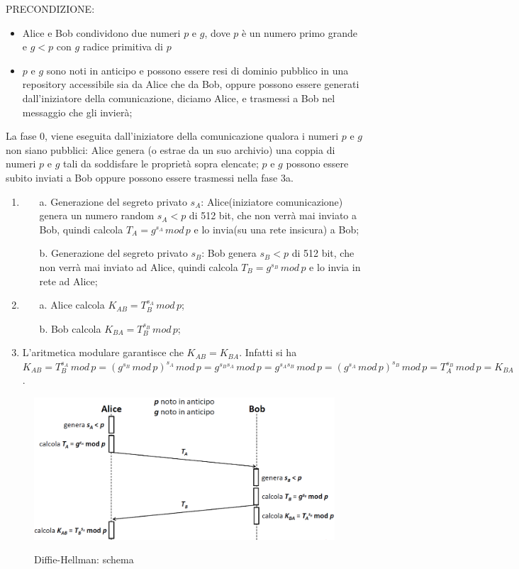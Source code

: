 PRECONDIZIONE: 
\begin{itemize}
\item Alice e Bob condividono due numeri $p$ e $g$, dove $p$ è un numero primo grande e $g<p$ con $g$ radice primitiva di $p$
\item $p$ e $g$ sono noti in anticipo e possono essere resi di dominio pubblico in una repository accessibile sia da Alice che da Bob, oppure possono essere generati dall'iniziatore della comunicazione,
diciamo Alice, e trasmessi a Bob nel messaggio che gli invierà;
\end{itemize}
La fase 0, viene eseguita dall'iniziatore della comunicazione qualora i numeri $p$ e $g$ non siano pubblici: Alice genera (o estrae da un suo archivio) una coppia di numeri $p$ e $g$ tali da soddisfare le proprietà sopra elencate; $p$ e $g$ possono essere subito inviati a Bob oppure possono essere trasmessi nella fase 3a.
\begin{enumerate}
\item \begin{enumerate}
\item [a.] Generazione del segreto privato $s_{A}$: Alice(iniziatore comunicazione) genera un numero random $s_{A}<p$ di 512 bit, che non verrà mai inviato a Bob, quindi calcola $T_{A}=g^{s_{A}} \, mod \,p$ e lo invia(su una rete insicura) a Bob;
\item [b.] Generazione del segreto privato $s_{B}$: Bob genera $s_{B}<p$ di 512 bit, che non verrà mai inviato ad Alice, quindi calcola $T_{B}=g^{s_{B}} \, mod \, p$ e lo invia in rete ad Alice;
\end{enumerate}
\item \begin{enumerate}
\item [a.] Alice calcola $K_{AB}=T_{B}^{s_{A}} \, mod \,p$;
\item [b.] Bob calcola $K_{BA}=T_{B}^{s_{B}} \, mod \, p$;
\end{enumerate}
\item L'aritmetica modulare garantisce che $K_{AB}=K_{BA}$. Infatti si ha $ K_{AB} = T_{B}^{s_{A}} \, mod \,p = ({g^{s_{B}} \, mod \, p})^{s_{A}} \, mod \,p = g^{s_{B}s_{A}} \, mod \, p = g^{s_{A}s_{B}} \, mod \, p = ({g^{s_{A}} \, mod \, p})^{s_{B}} \, mod \,p = T_{A}^{s_{B}} \, mod \, p = K_{BA}$.
\end{enumerate}
\begin{figure}[htbp]
	\centering%
	\subfigure%
	{\includegraphics[scale=0.5, keepaspectratio]{Immagini/Capitolo6/DiffieHellman_schema.png}}
	\caption{Diffie-Hellman: schema}
	\end{figure}

